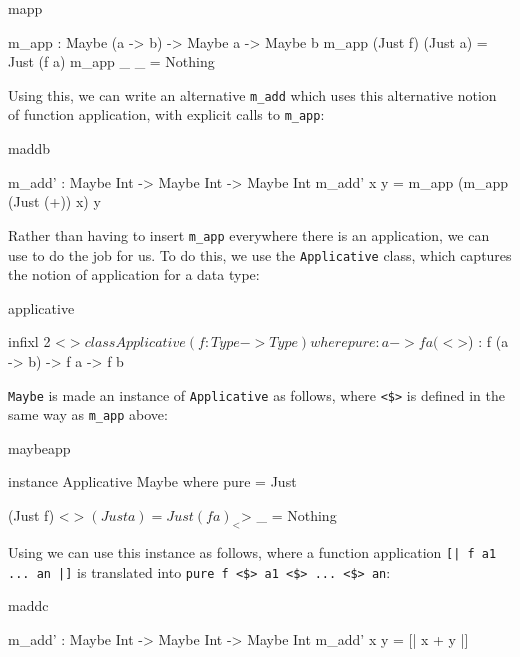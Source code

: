 \begin{SaveVerbatim}{mapp}

m_app : Maybe (a -> b) -> Maybe a -> Maybe b
m_app (Just f) (Just a) = Just (f a)
m_app _        _        = Nothing

\end{SaveVerbatim}

\noindent
Using this, we can write an alternative \texttt{m\_add} which uses this alternative
notion of function application, with explicit calls to \texttt{m\_app}:

\begin{SaveVerbatim}{maddb}

m_add' : Maybe Int -> Maybe Int -> Maybe Int
m_add' x y = m_app (m_app (Just (+)) x) y

\end{SaveVerbatim}

\noindent
Rather than having to insert \texttt{m\_app} everywhere there is an application, we can
use  to do the job for us. To do this, we use the \texttt{Applicative} 
class, which captures the notion of application for a data type:

\begin{SaveVerbatim}{applicative}

infixl 2 <$> 

class Applicative (f : Type -> Type) where 
    pure  : a -> f a
    (<$>) : f (a -> b) -> f a -> f b 

\end{SaveVerbatim}

\noindent
\texttt{Maybe} is made an instance of \texttt{Applicative} as follows, where \texttt{<\$>}
is defined in the same way as \texttt{m\_app} above:

\begin{SaveVerbatim}{maybeapp}

instance Applicative Maybe where
    pure = Just

    (Just f) <$> (Just a) = Just (f a)
    _        <$> _        = Nothing

\end{SaveVerbatim}

\noindent
Using  we can use this instance as follows, where a function
application \texttt{[| f a1 ... an |]}
is translated into \texttt{pure f <\$> a1 <\$> ... <\$> an}:

\begin{SaveVerbatim}{maddc}

m_add' : Maybe Int -> Maybe Int -> Maybe Int
m_add' x y = [| x + y |]

\end{SaveVerbatim}

